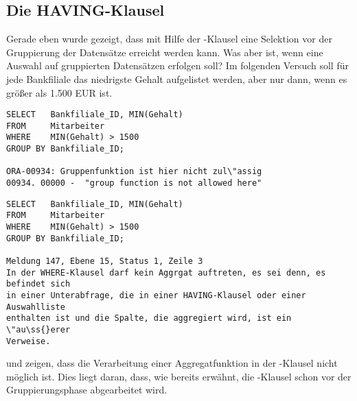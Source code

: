       \subsection{Die HAVING-Klausel}
        Gerade eben wurde gezeigt, dass mit Hilfe der \WHERE-Klausel eine Selektion vor der Gruppierung der Datens\"atze erreicht werden kann. Was aber ist, wenn eine Auswahl auf gruppierten Datens\"atzen erfolgen soll? Im folgenden Versuch soll f\"ur jede Bankfiliale das niedrigste Gehalt aufgelistet werden, aber nur dann, wenn es gr\"o\ss{}er als 1.500 EUR ist.
        \begin{lstlisting}[language=oracle_sql,caption={Ein Versuch\dots mit Oracle},label=sql05_16]
SELECT   Bankfiliale_ID, MIN(Gehalt)
FROM     Mitarbeiter
WHERE    MIN(Gehalt) > 1500
GROUP BY Bankfiliale_ID;

ORA-00934: Gruppenfunktion ist hier nicht zul\"assig
00934. 00000 -  "group function is not allowed here"
        \end{lstlisting}
        \begin{lstlisting}[language=ms_sql,caption={Der gleiche Versuch\dots mit MS SQL Server},label=sql05_17]
SELECT   Bankfiliale_ID, MIN(Gehalt)
FROM     Mitarbeiter
WHERE    MIN(Gehalt) > 1500
GROUP BY Bankfiliale_ID;

Meldung 147, Ebene 15, Status 1, Zeile 3
In der WHERE-Klausel darf kein Aggrgat auftreten, es sei denn, es befindet sich
in einer Unterabfrage, die in einer HAVING-Klausel oder einer Auswahlliste
enthalten ist und die Spalte, die aggregiert wird, ist ein \"au\ss{}erer
Verweise.
        \end{lstlisting}
         und  zeigen, dass die Verarbeitung einer Aggregatfunktion in der \WHERE-Klausel nicht m\"oglich ist. Dies liegt daran, dass, wie bereits erw\"ahnt, die \WHERE-Klausel schon vor der Gruppierungsphase abgearbeitet wird.

